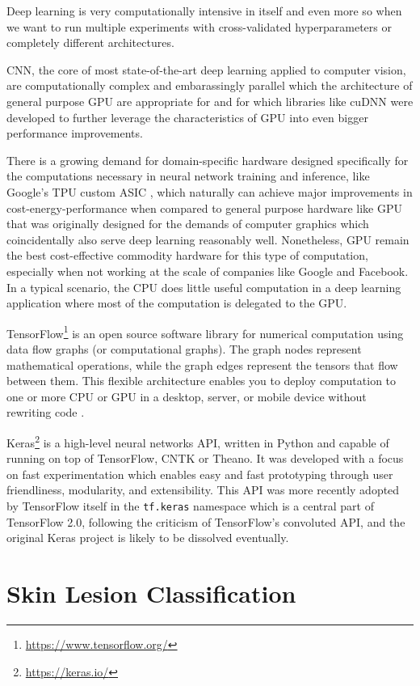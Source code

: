 Deep learning is very computationally intensive in itself and even more so when we want to run multiple experiments with cross-validated hyperparameters or completely different architectures.

\ac{CNN}, the core of most state-of-the-art deep learning applied to computer vision, are computationally complex and embarassingly parallel \cite{chang2017} which the architecture of general purpose \ac{GPU} are appropriate for \cite{gpu} and for which libraries like cuDNN \cite{cudnn} were developed to further leverage the characteristics of \ac{GPU} into even bigger performance improvements.

There is a growing demand for domain-specific hardware designed specifically for the computations necessary in neural network training and inference, like Google's TPU custom ASIC \cite{tpu}, which naturally can achieve major improvements in cost-energy-performance when compared to general purpose hardware like \ac{GPU} that was originally designed for the demands of computer graphics which coincidentally also serve deep learning reasonably well. Nonetheless, \ac{GPU} remain the best cost-effective commodity hardware for this type of computation, especially when not working at the scale of companies like Google and Facebook. In a typical scenario, the CPU does little useful computation in a deep learning application where most of the computation is delegated to the GPU.

TensorFlow\footnote{\url{https://www.tensorflow.org/}} is an open source software library for numerical computation using data flow graphs (or computational graphs). The graph nodes represent mathematical operations, while the graph edges represent the tensors that flow between them. This flexible architecture enables you to deploy computation to one or more CPU or GPU in a desktop, server, or mobile device without rewriting code \cite{tensorflow}.

Keras\footnote{\url{https://keras.io/}} is a high-level neural networks API, written in Python and capable of running on top of TensorFlow, CNTK or Theano. It was developed with a focus on fast experimentation which enables easy and fast prototyping through user friendliness, modularity, and extensibility. This API was more recently adopted by TensorFlow itself in the \verb|tf.keras| namespace which is a central part of TensorFlow 2.0, following the criticism of TensorFlow's convoluted API, and the original Keras project is likely to be dissolved eventually.

\section{Skin Lesion Classification}

